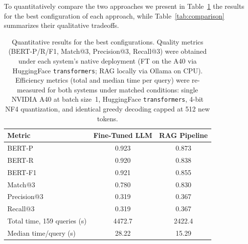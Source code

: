 \documentclass[pdflatex,sn-mathphys-num]{sn-jnl}%
\theoremstyle{thmstyleone}%
\theoremstyle{thmstyletwo}%
\theoremstyle{thmstylethree}%
\begin{document}

To quantitatively compare the two approaches we present in Table~\ref{tab:results} the results for the 
best configuration of each approach, while Table~\ref{tab:comparison} 
summarizes their qualitative tradeoffs.

\begin{table}[htbp]
    \centering
    \begin{tabular}{lcc}
    \toprule
    \textbf{Metric} & \textbf{Fine-Tuned LLM} & \textbf{RAG Pipeline} \\
    \midrule
    BERT-P  & 0.923 & 0.873 \\
    BERT-R     & 0.920 & 0.838 \\
    BERT-F1         & 0.921 & 0.855 \\
    \midrule
    Match@3         & 0.780 & 0.830 \\
    Precision@3     & 0.319 & 0.367 \\
    Recall@3        & 0.319 & 0.367 \\
    \midrule
    Total time, 159 queries (s) & 4472.7 & 2422.4 \\
    Median time/query (s)       & 28.22  & 15.29  \\
    \bottomrule
    \end{tabular}
    \caption{Quantitative results for the best configurations. Quality metrics (BERT-P/R/F1, Match@3, Precision@3, Recall@3) were obtained under each system's native deployment (FT on the A40 via HuggingFace \texttt{transformers}; RAG locally via Ollama on CPU). Efficiency metrics (total and median time per query) were re-measured for both systems under matched conditions: single NVIDIA A40 at batch size~1, HuggingFace \texttt{transformers}, 4-bit NF4 quantization, and identical greedy decoding capped at 512 new tokens.}
    \label{tab:results}
\end{table}
    
\end{document}
